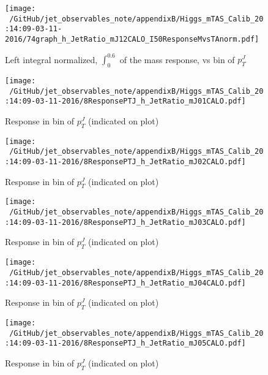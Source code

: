 \begin{figure}

\texttt{[image: ~/GitHub/jet\_observables\_note/appendixB/Higgs\_mTAS\_Calib\_20:14:09-03-11-2016/74graph\_h\_JetRatio\_mJ12CALO\_I50ResponseMvsTAnorm.pdf]}
\caption{Left integral normalized, $\int_{0}^{0.6} $ of the mass response, vs bin of  $p_{T}^{J}$}

\end{figure}
 \clearpage %
\begin{figure}

\texttt{[image: ~/GitHub/jet\_observables\_note/appendixB/Higgs\_mTAS\_Calib\_20:14:09-03-11-2016/8ResponsePTJ\_h\_JetRatio\_mJ01CALO.pdf]}
\caption{Response in bin of  $p_{T}^{J}$ (indicated on plot)} 

\end{figure}

\begin{figure}

\texttt{[image: ~/GitHub/jet\_observables\_note/appendixB/Higgs\_mTAS\_Calib\_20:14:09-03-11-2016/8ResponsePTJ\_h\_JetRatio\_mJ02CALO.pdf]}
\caption{Response in bin of  $p_{T}^{J}$ (indicated on plot)} 

\end{figure}

\begin{figure}

\texttt{[image: ~/GitHub/jet\_observables\_note/appendixB/Higgs\_mTAS\_Calib\_20:14:09-03-11-2016/8ResponsePTJ\_h\_JetRatio\_mJ03CALO.pdf]}
\caption{Response in bin of  $p_{T}^{J}$ (indicated on plot)} 

\end{figure}

\begin{figure}

\texttt{[image: ~/GitHub/jet\_observables\_note/appendixB/Higgs\_mTAS\_Calib\_20:14:09-03-11-2016/8ResponsePTJ\_h\_JetRatio\_mJ04CALO.pdf]}
\caption{Response in bin of  $p_{T}^{J}$ (indicated on plot)} 

\end{figure}

\begin{figure}

\texttt{[image: ~/GitHub/jet\_observables\_note/appendixB/Higgs\_mTAS\_Calib\_20:14:09-03-11-2016/8ResponsePTJ\_h\_JetRatio\_mJ05CALO.pdf]}
\caption{Response in bin of  $p_{T}^{J}$ (indicated on plot)} 

\end{figure}

